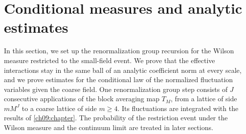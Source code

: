 \chapter{Conditional measures and analytic estimates}\label{ch10:chapter}

In this section, we set up the renormalization group recursion for the Wilson measure restricted to the small-field event. We prove that the effective interactions stay in the same ball of an analytic coefficient norm at every scale, and we prove estimates for the conditional law of the normalized fluctuation variables given the coarse field. One renormalization group step consists of $J$ consecutive applications of the block averaging map $T_M$, from a lattice of side $mM^J$ to a coarse lattice of side $m\ge4$. Its fluctuations are integrated with the results of \cref{ch09:chapter}. The probability of the restriction event under the Wilson measure and the continuum limit are treated in later sections.

